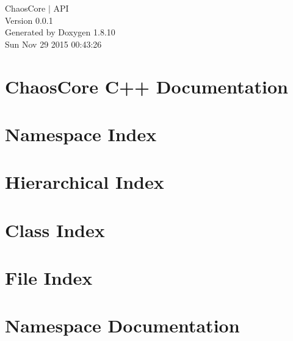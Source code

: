 \documentclass[twoside]{book}
\newcommand{\+}{\discretionary{\mbox{\scriptsize$\hookleftarrow$}}{}{}}
\newcommand{\clearemptydoublepage}{%
  \newpage{\pagestyle{empty}\cleardoublepage}%
}
\begin{document}
\hypersetup{pageanchor=false,
             bookmarks=true,
             bookmarksnumbered=true,
             pdfencoding=unicode
            }
\begin{titlepage}
\vspace*{7cm}
\begin{center}%
{\Large Chaos\+Core $\vert$ A\+P\+I \\[1ex]\large Version 0.\+0.\+1 }\\
\vspace*{1cm}
{\large Generated by Doxygen 1.8.10}\\
\vspace*{0.5cm}
{\small Sun Nov 29 2015 00:43:26}\\
\end{center}
\end{titlepage}
\clearemptydoublepage
\tableofcontents
\clearemptydoublepage
{}
\hypersetup{pageanchor=true}

\chapter{Chaos\+Core C++ Documentation}
\label{index}\hypertarget{index}{}
\chapter{Namespace Index}

\chapter{Hierarchical Index}

\chapter{Class Index}

\chapter{File Index}

\chapter{Namespace Documentation}













\end{document}
